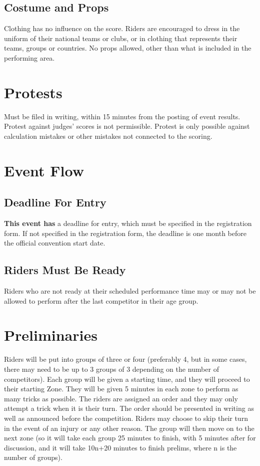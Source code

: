 \subsection{Costume and Props}
Clothing has no influence on the score.
Riders are encouraged to dress in the uniform of their national teams or clubs, or in clothing that represents their teams, groups or countries.
No props allowed, other than what is included in the performing area.

\section{Protests}

Must be filed in writing, within 15 minutes from the posting of event results.
Protest against judges' scores is not permissible.
Protest is only possible against calculation mistakes or other mistakes not connected to the scoring.

\section{Event Flow}

\subsection{Deadline For Entry}

\textbf{This event has} a deadline for entry, which must be specified in the registration form.
If not specified in the registration form, the deadline is one month before the official convention start date.

\subsection{Riders Must Be Ready}

Riders who are not ready at their scheduled performance time may or may not be allowed to perform after the last competitor in their age group.

\section{Preliminaries}
Riders will be put into groups of three or four (preferably 4, but in some cases, there may need to be up to 3 groups of 3 depending on the number of competitors).
Each group will be given a starting time, and they will proceed to their starting Zone.
They will be given 5 minutes in each zone to perform as many tricks as possible.
The riders are assigned an order and they may only attempt a trick when it is their turn.
The order should be presented in writing as well as announced before the competition.
Riders may choose to skip their turn in the event of an injury or any other reason.
The group will then move on to the next zone (so it will take each group 25 minutes to finish, with 5 minutes after for discussion, and it will take 10n+20 minutes to finish prelims, where n is the number of groups).

